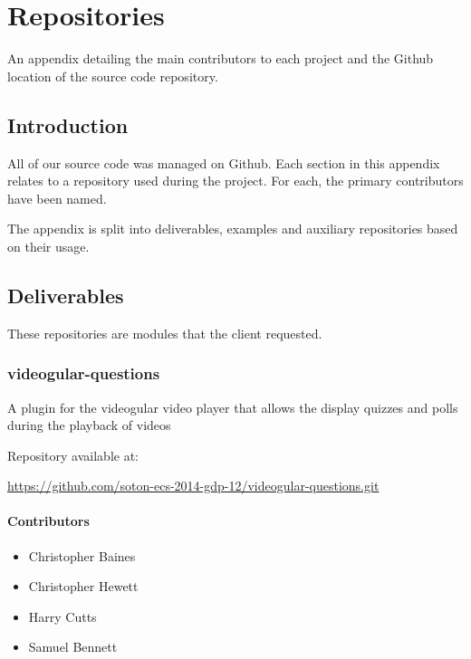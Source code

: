 \chapter{Repositories} \label{Chapter:Repositories}

An appendix detailing the main contributors to each project and the Github location of the source code repository.

\begin{preamble}
\end{preamble}

\section{Introduction}

All of our source code was managed on Github. Each section in this appendix relates to a repository used during the project. For each, the primary contributors have been named.

The appendix is split into deliverables, examples and auxiliary repositories based on their usage.

\section{Deliverables}

These repositories are modules that the client requested.

\subsection{videogular-questions}
\label{Section:Repo_videogular_questions}

A plugin for the videogular video player that allows the display quizzes and polls during the playback of videos

Repository available at:

\url{https://github.com/soton-ecs-2014-gdp-12/videogular-questions.git}

\subsubsection{Contributors}
\begin{itemize}
  \item Christopher Baines
  \item Christopher Hewett
  \item Harry Cutts
  \item Samuel Bennett
\end{itemize}

